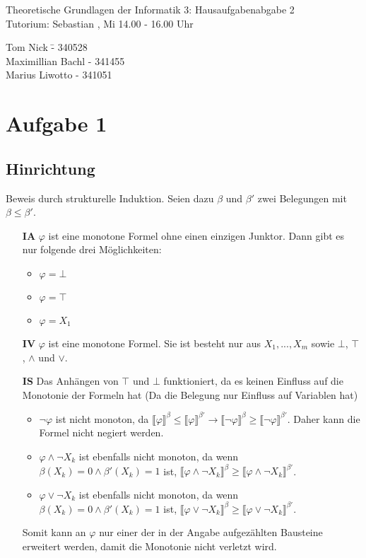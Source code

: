 \documentclass[a4paper,10pt]{article}
\begin{document}
\begin{center}
\Large{Theoretische Grundlagen der Informatik 3: Hausaufgabenabgabe 2} \\
\large{Tutorium: Sebastian , Mi 14.00 - 16.00 Uhr}
\end{center}
\begin{tabbing}
Tom Nick \hspace{2cm}\= - 340528\\
Maximillian Bachl \> - 341455 \\
Marius Liwotto\> -  341051
\end{tabbing}
\section*{Aufgabe 1}
\subsection*{Hinrichtung}
Beweis durch strukturelle Induktion. Seien dazu $\beta$ und $\beta'$ zwei Belegungen mit $\beta \leq \beta'$.
\begin{itemize}
\item[\textbf{IA}]
$\varphi$ ist eine monotone Formel ohne einen einzigen Junktor. Dann gibt es nur folgende drei Möglichkeiten:
\begin{itemize}
\item  $\varphi = \bot$
\item  $\varphi = \top$
\item  $\varphi = X_1$
\end{itemize}
\item[\textbf{IV}]
$\varphi$ ist eine monotone Formel. Sie ist besteht nur aus $X_1,...,X_m$ sowie $\bot$, $\top$, $\land$ und $\lor$.
\item[\textbf{IS}] 
Das Anhängen von $\top$ und $\bot$ funktioniert, da es keinen Einfluss auf die Monotonie der Formeln hat (Da die Belegung nur Einfluss auf Variablen hat)
\begin{itemize}
\item $\lnot \varphi$ ist nicht monoton, da $\llbracket \varphi \rrbracket^{\beta} \le \llbracket \varphi \rrbracket^{\beta'} \rightarrow \llbracket \lnot\varphi \rrbracket^{\beta} \ge \llbracket \lnot\varphi \rrbracket^{\beta'}$. Daher kann die Formel nicht negiert werden.
\item $\varphi \land \lnot X_k$ ist ebenfalls nicht monoton, da wenn $\beta(X_k) = 0 \land\beta'(X_k) = 1$ ist, $\llbracket \varphi \land \lnot X_k \rrbracket^{\beta} \ge \llbracket \varphi \land \lnot X_k \rrbracket^{\beta'}$. 
\item $\varphi \lor \lnot X_k$ ist ebenfalls nicht monoton, da wenn $\beta(X_k) = 0 \land\beta'(X_k) = 1$ ist, $\llbracket \varphi \lor \lnot X_k \rrbracket^{\beta} \ge \llbracket \varphi \lor \lnot X_k \rrbracket^{\beta'}$. 
\end{itemize}
Somit kann an $\varphi$ nur einer der in der Angabe aufgezählten Bausteine erweitert werden, damit die Monotonie nicht verletzt wird.
\end{itemize}
\end{document}
